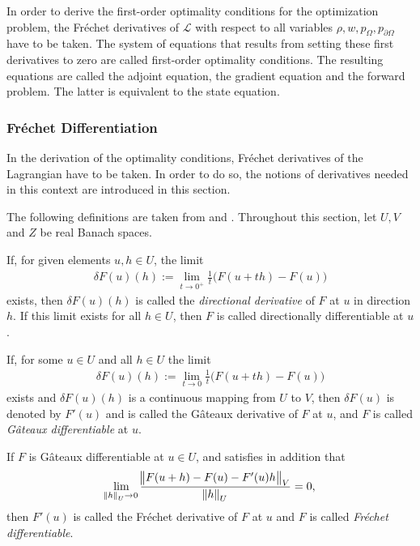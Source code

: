 In order to derive the first-order optimality conditions for the optimization problem, the Fr\'echet derivatives of $\mathcal{L}$ with respect to all variables $\rho, w, p_\Omega, p_{\partial \Omega}$ have to be taken. The system of equations that results from setting these first derivatives to zero are called first-order optimality conditions. The resulting equations are called the adjoint equation, the gradient equation and the forward problem. The latter is equivalent to the state equation.

\subsubsection{Fr\'echet Differentiation}
In the derivation of the optimality conditions, Fr\'echet derivatives of the Lagrangian have to be taken. In order to do so, the notions of derivatives needed in this context are introduced in this section.

The following definitions are taken from \cite{DeLosReyesOptimization} and \cite{FrechetProductrule1}.
Throughout this section, let $U,V$ and $Z$ be real Banach spaces.
\theoremstyle{definition}
\begin{definition}\cite{DeLosReyesOptimization}
If, for given elements $ u,h \in U$, the limit
\begin{align*}
\delta F(u)(h) := \lim_{t\to 0^+} \frac{1}{t} \bigg( F(u+th) - F(u) \bigg)
\end{align*}
exists, then $\delta F(u)(h)$ is called the \emph{directional derivative} of $F$ at $u$ in direction $h$. If this limit exists for all $h \in U$, then $F$ is called directionally differentiable at $u$.
\end{definition}
\theoremstyle{definition}
\begin{definition}\cite{DeLosReyesOptimization}
	If, for some $ u \in U$ and all $h \in U$ the limit
	\begin{align*}
	\delta F(u)(h) := \lim_{t\to 0} \frac{1}{t} \bigg( F(u+th) - F(u) \bigg)
	\end{align*}
	exists and $\delta F(u)(h)$ is a continuous mapping from $U$ to $V$, then $\delta F(u)$ is denoted by $F'(u)$ and is called the G\^{a}teaux derivative of $F$ at $u$, and $F$ is called \emph{G\^{a}teaux differentiable} at $u$.
\end{definition}

\theoremstyle{definition}
\begin{definition}\cite{DeLosReyesOptimization}
If $F$ is G\^{a}teaux differentiable at $u \in U$, and satisfies in addition that
\begin{align*}
\lim_{\norm{h}_U \to 0} \frac{\norm{F(u+h)-F(u) -F'(u)h}_V}{\norm{h}_U}=0,
\end{align*}
then $F'(u)$ is called the Fr\'echet derivative of $F$ at $u$ and $F$ is called \emph{Fr\'echet differentiable}.
\end{definition}


